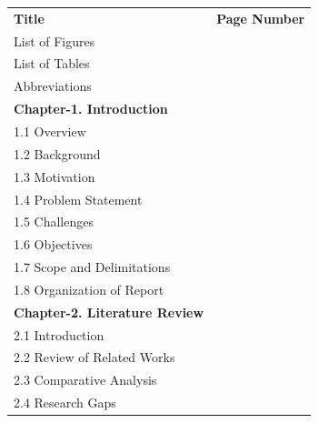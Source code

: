 \noindent \begin{tabular*}{\textwidth}{l @{\extracolsep{\fill}} r}
                \textbf{Title} & \textbf{Page Number} \\[0.6cm]
                
                List of Figures & \pageref{front:list-figures} \\[0.3cm]
                List of Tables & \pageref{front:list-tables} \\[0.3cm]
                Abbreviations & \pageref{front:abbreviations} \\[0.5cm]
                
                \textbf{Chapter-1. Introduction} & \pageref{chap:introduction} \\
                \hspace{0.5cm} 1.1 Overview & \pageref{sec:introduction-overview} \\
                \hspace{0.5cm} 1.2 Background & \pageref{sec:introduction-background} \\
                \hspace{0.5cm} 1.3 Motivation & \pageref{sec:introduction-motivation} \\
                \hspace{0.5cm} 1.4 Problem Statement & \pageref{sec:introduction-problem} \\
                \hspace{0.5cm} 1.5 Challenges & \pageref{sec:introduction-challenges} \\
                \hspace{0.5cm} 1.6 Objectives & \pageref{sec:introduction-objectives} \\
                \hspace{0.5cm} 1.7 Scope and Delimitations & \pageref{sec:introduction-scope} \\
                \hspace{0.5cm} 1.8 Organization of Report & \pageref{sec:introduction-organization} \\[0.4cm]
                
                \textbf{Chapter-2. Literature Review} & \pageref{chap:literature-review} \\
                \hspace{0.5cm} 2.1 Introduction & \pageref{sec:literature-introduction} \\
                \hspace{0.5cm} 2.2 Review of Related Works & \pageref{sec:literature-related-works} \\
                \hspace{0.5cm} 2.3 Comparative Analysis & \pageref{sec:literature-comparative-analysis} \\
                \hspace{0.5cm} 2.4 Research Gaps & \pageref{sec:literature-research-gaps} \\[0.4cm]
                

\end{tabular*}
